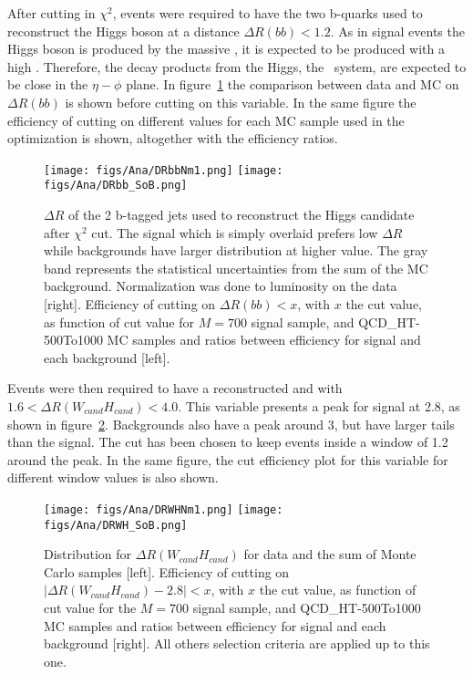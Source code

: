 After cutting in $\chi^{2}$, events were required to have the two b-quarks used to reconstruct the Higgs boson at a distance $\Delta R(bb)<1.2$. As in signal events the Higgs boson is produced by the massive \Tp, it is expected to be produced with a high \pt. Therefore, the decay products from the Higgs, the \bbbar~system, are expected to be close in the $\eta-\phi$ plane. In figure~\ref{fig:DRbb} the comparison between data and MC on $\Delta R(bb)$ is shown before cutting on this variable. In the same figure the efficiency of cutting on different values for each MC sample used in the optimization is shown, altogether with the efficiency ratios. %

\begin{figure}[!Hhtbp]
  \begin{center}
    \texttt{[image: figs/Ana/DRbbNm1.png]}
    \texttt{[image: figs/Ana/DRbb\_SoB.png]}
    \caption{$\Delta R$ of the 2 b-tagged jets used to reconstruct the Higgs candidate after $\chi^{2}$ cut. The signal which is simply overlaid prefers low $\Delta R$ while backgrounds have larger distribution at higher value. The gray band represents the statistical uncertainties from the sum of the MC background. Normalization was done to luminosity on the data [right]. Efficiency of cutting on $\Delta R(bb)<x$, with $x$ the cut value, as function of cut value for $M=700$ \GeVcc signal sample, \ttbar and QCD\_HT-500To1000 MC samples and ratios between efficiency for signal and each background [left].}
    \label{fig:DRbb}
  \end{center}
\end{figure}

Events were then required to have a reconstructed \W and \Hb with $1.6<\Delta R (W_{cand} H_{cand})<4.0$. This variable presents a peak for signal at 2.8, as shown in figure~\ref{fig:DRWH}. Backgrounds also have a peak around 3, but have larger tails than the signal. The cut has been chosen to keep events inside a window of 1.2 around the peak. In the same figure, the cut efficiency plot for this variable for different window values is also shown.

\begin{figure}[!Hhtbp]
  \begin{center}
    \texttt{[image: figs/Ana/DRWHNm1.png]}
    \texttt{[image: figs/Ana/DRWH\_SoB.png]}
    \caption{Distribution for $\Delta R (W_{cand} H_{cand})$ for data and the sum of Monte Carlo samples [left]. Efficiency of cutting on $|\Delta R(W_{cand} H_{cand})-2.8|<x$, with $x$ the cut value, as function of cut value for the $M=700$ \GeVcc signal sample, \ttbar and QCD\_HT-500To1000 MC samples and ratios between efficiency for signal and each background [right]. All others selection criteria are applied up to this one.}
    \label{fig:DRWH}
  \end{center}
\end{figure}

